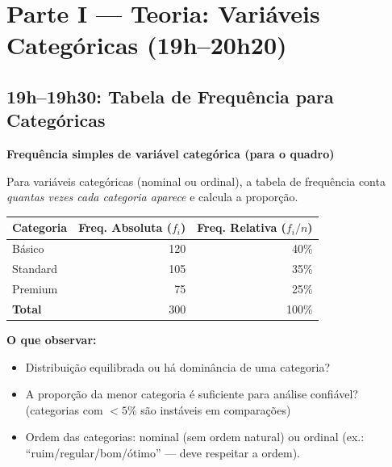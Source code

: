 \section{Parte I — Teoria: Variáveis Categóricas (19h–20h20)}

\subsection{19h–19h30: Tabela de Frequência para Categóricas}

\begin{BoardBox}
\textbf{Frequência simples de variável categórica (para o quadro)}

Para variáveis categóricas (nominal ou ordinal), a tabela de frequência
conta \emph{quantas vezes cada categoria aparece} e calcula a proporção.

\begin{center}
\begin{tabular}{|l|r|r|}
\hline
\textbf{Categoria} & \textbf{Freq. Absoluta ($f_i$)} & \textbf{Freq. Relativa ($f_i/n$)} \\
\hline
Básico    & 120 & 40\% \\
Standard  & 105 & 35\% \\
Premium   &  75 & 25\% \\
\hline
\textbf{Total} & 300 & 100\% \\
\hline
\end{tabular}
\end{center}

\textbf{O que observar:}
\begin{itemize}
  \item Distribuição equilibrada ou há dominância de uma categoria?
  \item A proporção da menor categoria é suficiente para análise confiável?
  (categorias com $< 5\%$ são instáveis em comparações)
  \item Ordem das categorias: nominal (sem ordem natural) ou ordinal (ex.:
  ``ruim/regular/bom/ótimo'' — deve respeitar a ordem).
\end{itemize}
\end{BoardBox}

